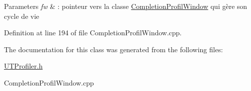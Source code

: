 \begin{DoxyParams}{Parameters}
{\em fw} & \-: pointeur vers la classe \hyperlink{class_completion_profil_window}{Completion\-Profil\-Window} qui gère son cycle de vie \\
\hline
\end{DoxyParams}


Definition at line 194 of file Completion\-Profil\-Window.\-cpp.



The documentation for this class was generated from the following files\-:\begin{DoxyCompactItemize}
\item 
\hyperlink{_u_t_profiler_8h}{U\-T\-Profiler.\-h}\item 
Completion\-Profil\-Window.\-cpp\end{DoxyCompactItemize}

